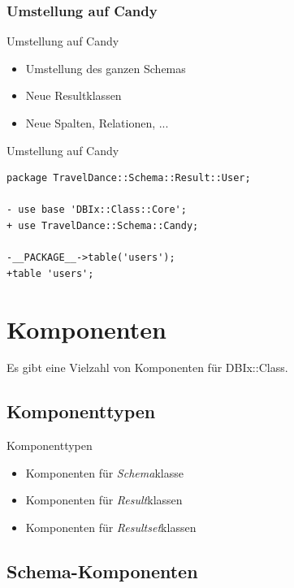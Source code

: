 \subsubsection{Umstellung auf Candy}

\begin{frame}[fragile]{Umstellung auf Candy}
  \begin{itemize}
  \item Umstellung des ganzen Schemas
  \item Neue Resultklassen
  \item Neue Spalten, Relationen, ...
  \end{itemize}
\end{frame}

\begin{frame}[fragile]{Umstellung auf Candy}
  \begin{lstlisting}
package TravelDance::Schema::Result::User;

- use base 'DBIx::Class::Core';
+ use TravelDance::Schema::Candy;

-__PACKAGE__->table('users');
+table 'users';

\end{lstlisting}
\end{frame}

\section{Komponenten}

Es gibt eine Vielzahl von Komponenten für DBIx::Class.

\subsection{Komponenttypen}

\begin{frame}[fragile]{Komponenttypen}
  \begin{itemize}
  \item Komponenten für \emph{Schema}klasse
  \item Komponenten für \emph{Result}klassen
  \item Komponenten für \emph{Resultset}klassen
  \end{itemize}
\end{frame}

\subsection{Schema-Komponenten}


